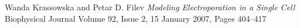 \backmatter


\begin{thebibliography}{99}

	Wanda Krassowska and Petar D. Filev
	\emph{Modeling Electroporation in a Single Cell}
	Biophysical Journal
	Volume 92, Issue 2, 15 January 2007, Pages 404–417



\begin{comment}
1. Colombo L, González G, Marshall G, Molina F, Soba A, Suárez C, Turjanski P; Bioelectrochemistry 71.(2007)

2. Nilsson E, von Euler H, Berendson J, Thorne A, Wersall P, Naslund I, Lagerstedt A, Narfstrom K, Olsson J; Bioelectrochemistry 51 (2000)

3. Netti PA, Berk DA, Swartz MA, Grodzinsky AJ,Jain RK; Cancer Research 60 (2000) 

4 - Matías Daniel Marino, Dr. Pablo Turjanski, Dr. Nahuel Olaiz, Electroporación en el tratamiento de tumores: modelos teóricos y experimentales, (2013).

5 - G. Puchiar, T. Kotnik, B. Valic and D. Miklavcic; Annals of Biomedical Engineering, Volume 34, 4, (2006).

6 - Qiong Zheng, Duan Chen and Guo-Wei Wei; Journal of Computational Physics,	Volume 230,13, (2011).

7 - Wanda Krassowska, Petar D. Filev; Biophysical Journal, Volume 92, Issue 2, (2007).

8-Jianbo Li, Hao Lin, Numerical simulation of molecular uptake via electroporation, Bioelectrochemistry 82 (2011) 10–21

9 - Stanley Humphries; Finite-element Methods for Electromagnetics, (2010).

10 - O.C. Zienkiewicz, R.L. Taylor, The Finite Element Method Volume I: The Basis, Butterworth-Heinemann, 5th edition, (2000).

11 - http://www.automesh2d.com/

12- Cooper, La célula, pág 470-471, 2ª edición, Ed. Marbán

13- P.H. Mott_, J.R. Dorgan1, C.M. Roland The bulk modulus and Poisson’s ratio of ‘‘incompressible’’ materials Journal of Sound and Vibration 312 (2008) 572–575

14- John David Jackson,"Classical Electrodynamics, 3rd Ed.", John Wiley & Sons, Inc., 1999.

15- Nieves, Antonio (2007). Métodos numéricos aplicados a la ingeniería. Grupo editorial Patria.

16- www.paraview.org
\end{comment}

\end{thebibliography}
